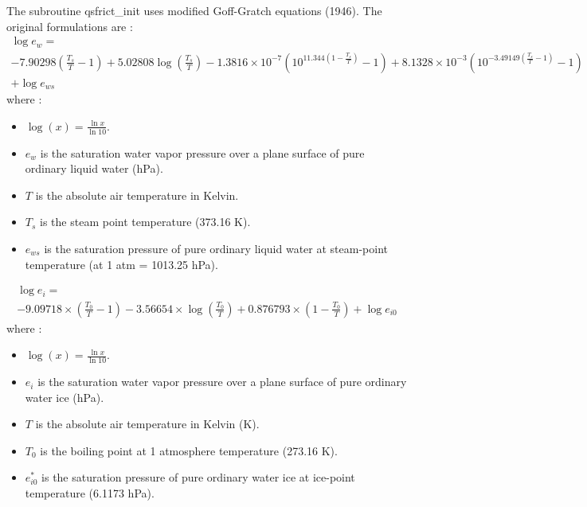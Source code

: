 The subroutine qsfrict\_init uses modified Goff-Gratch equations (1946). The original formulations are : \\
\begin{multline}
\log e_w = \\ -7.90298 \left( \frac{T_s}{T} - 1 \right) + 5.02808 \log \left( \frac{T_s}{T} \right) 
- 1.3816 \times 10^{-7}(10^{11.344 \left( 1-\frac{T_s}{T} \right)}-1) 
+ 8.1328 \times 10^{-3}(10^{-3.49149 \left( \frac{T_s}{T}-1 \right)}
-1) \\ + \log e_{ws}
\end{multline}
where : \\
\begin{itemize}
 \item  $ \log(x) = \frac{\ln x}{\ln 10} $. 
 \item  $e_w$ is the saturation water vapor pressure over a plane surface of pure ordinary liquid water (hPa).
 \item  $T$ is the absolute air temperature in Kelvin.
 \item  $T_s$ is the steam point temperature (373.16 K).
 \item  $e_{ws}$ is the saturation pressure of pure ordinary liquid water at steam-point temperature (at 1 atm = 1013.25 hPa).
\end{itemize}

\begin{multline}
\log e_i = \\ -9.09718 \times \left( \frac{T_0}{T} - 1 \right) - 3.56654 \times \log \left( \frac{T_0}{T} \right) 
+ 0.876793 \times \left( 1-\frac{T_0}{T} \right) 
+ \log e_{i0}
\end{multline}
where : \\
\begin{itemize}
 \item  $ \log(x) = \frac{\ln x}{\ln 10} $. 
 \item  $e_i$ is the saturation water vapor pressure over a plane surface of pure ordinary water ice (hPa).
 \item  $T$ is the absolute air temperature in Kelvin (K).
 \item  $T_0$ is the boiling point at 1 atmosphere temperature (273.16 K).
 \item  $e^{*}_{i0}$  is the saturation pressure of pure ordinary water ice at ice-point temperature (6.1173 hPa).
\end{itemize}


